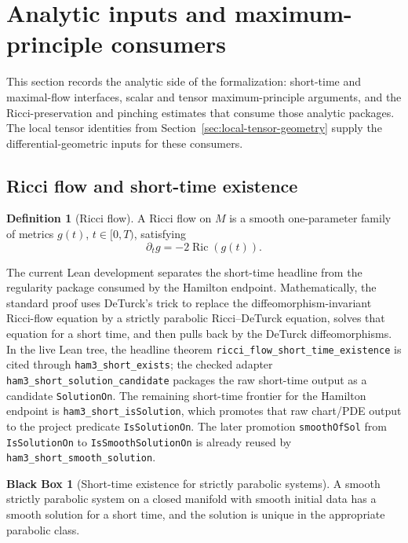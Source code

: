 \documentclass[11pt]{article}
\theoremstyle{plain}
\theoremstyle{definition}
\newtheorem{definition}[theorem]{Definition}
\newtheorem{blackbox}[theorem]{Black Box}
\theoremstyle{remark}
\newcommand{\Ric}{\operatorname{Ric}}
\newcommand{\leanref}[1]{\nolinkurl{#1}}
\begin{document}
\section{Analytic inputs and maximum-principle consumers}
\label{sec:analytic-consumers}

This section records the analytic side of the formalization: short-time and
maximal-flow interfaces, scalar and tensor maximum-principle arguments, and the
Ricci-preservation and pinching estimates that consume those analytic packages.
The local tensor identities from Section~\ref{sec:local-tensor-geometry} supply
the differential-geometric inputs for these consumers.

\subsection{Ricci flow and short-time existence}

\begin{definition}[Ricci flow]
\label{def:ricci-flow}
A Ricci flow on $M$ is a smooth one-parameter family of metrics $g(t)$,
$t\in[0,T)$, satisfying
\[
  \partial_tg=-2\Ric(g(t)).
\]
\end{definition}

The current Lean development separates the short-time headline from the
regularity package consumed by the Hamilton endpoint.  Mathematically, the
standard proof uses DeTurck's trick to replace the diffeomorphism-invariant
Ricci-flow equation by a strictly parabolic Ricci--DeTurck equation, solves
that equation for a short time, and then pulls back by the DeTurck
diffeomorphisms.  In the live Lean tree, the headline theorem
\leanref{ricci_flow_short_time_existence} is cited through
\leanref{ham3_short_exists}; the checked adapter
\leanref{ham3_short_solution_candidate} packages the raw short-time output as a
candidate \leanref{SolutionOn}.  The remaining short-time frontier for the
Hamilton endpoint is \leanref{ham3_short_isSolution}, which promotes that raw
chart/PDE output to the project predicate \leanref{IsSolutionOn}.  The later
promotion \leanref{smoothOfSol} from \leanref{IsSolutionOn} to
\leanref{IsSmoothSolutionOn} is already reused by
\leanref{ham3_short_smooth_solution}.

\begin{blackbox}[Short-time existence for strictly parabolic systems]
\label{bb:strictly-parabolic-short-time}
A smooth strictly parabolic system on a closed manifold with smooth initial data
has a smooth solution for a short time, and the solution is unique in the
appropriate parabolic class.
\end{blackbox}
\end{document}
